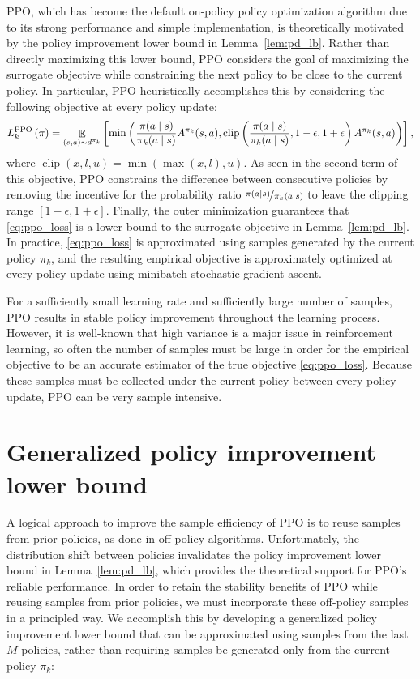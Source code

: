 \documentclass{article}
\begin{document}
PPO, which has become the default on-policy policy optimization algorithm due to its strong performance and simple implementation, is theoretically motivated by the policy improvement lower bound in Lemma~\ref{lem:pd_lb}. Rather than directly maximizing this lower bound, PPO considers the goal of maximizing the surrogate objective while constraining the next policy to be close to the current policy. In particular, PPO heuristically accomplishes this by considering the following objective at every policy update:
\begin{equation}\label{eq:ppo_loss}
L^{\textnormal{PPO}}_k \left( \pi \right) = \mathop{\mathbb{E}}_{(s,a) \sim d^{\pi_k}} \left[ \min \left(  \frac{\pi(a \mid s)}{\pi_k(a \mid s)} A^{\pi_k}(s,a),  \operatorname{clip}\left( \frac{\pi(a \mid s)}{\pi_k(a \mid s)},1-\epsilon,1+\epsilon \right) A^{\pi_k}(s,a) \right) \right],
\end{equation}
where $\operatorname{clip}(x,l,u) = \min (\max (x, l), u)$. As seen in the second term of this objective, PPO constrains the difference between consecutive policies by removing the incentive for the probability ratio $\nicefrac{\pi(a \mid s)}{\pi_k(a \mid s)}$ to leave the clipping range $[1-\epsilon,1+\epsilon]$. Finally, the outer minimization guarantees that \eqref{eq:ppo_loss} is a lower bound to the surrogate objective in Lemma~\ref{lem:pd_lb}. In practice, \eqref{eq:ppo_loss} is approximated using samples generated by the current policy $\pi_k$, and the resulting empirical objective is approximately optimized at every policy update using minibatch stochastic gradient ascent. 

For a sufficiently small learning rate and sufficiently large number of samples, PPO results in stable policy improvement throughout the learning process. However, it is well-known that high variance is a major issue in reinforcement learning, so often the number of samples must be large in order for the empirical objective to be an accurate estimator of the true objective \eqref{eq:ppo_loss}. Because these samples must be collected under the current policy between every policy update, PPO can be very sample intensive.


\section{Generalized policy improvement lower bound}

A logical approach to improve the sample efficiency of PPO is to reuse samples from prior policies, as done in off-policy algorithms. Unfortunately, the distribution shift between policies invalidates the policy improvement lower bound in Lemma~\ref{lem:pd_lb}, which provides the theoretical support for PPO's reliable performance. In order to retain the stability benefits of PPO while reusing samples from prior policies, we must incorporate these off-policy samples in a principled way. We accomplish this by developing a generalized policy improvement lower bound that can be approximated using samples from the last $M$ policies, rather than requiring samples be generated only from the current policy $\pi_k$:
\end{document}
